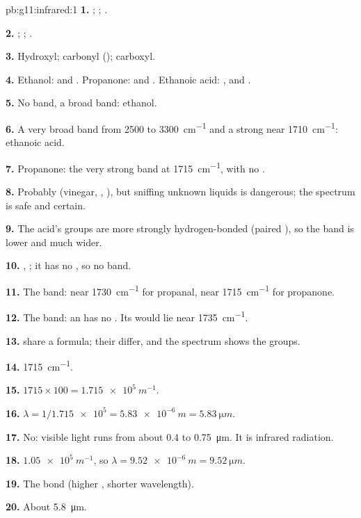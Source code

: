 \begin{solution}{pb:g11:infrared:1}
\textbf{1.} ; ; .

\textbf{2.} ; ; .

\textbf{3.} Hydroxyl; carbonyl (); carboxyl.

\textbf{4.} Ethanol:  and . Propanone:  and
. Ethanoic acid: ,  and .

\textbf{5.} No  band, a broad  band: ethanol.

\textbf{6.} A very broad  band from 2500 to \qty{3300}{cm^{-1}}
and a strong  near \qty{1710}{cm^{-1}}: ethanoic acid.

\textbf{7.} Propanone: the very strong  band at
\qty{1715}{cm^{-1}}, with no .

\textbf{8.} Probably (vinegar, , ), but sniffing unknown
liquids is dangerous; the spectrum is safe and certain.

\textbf{9.} The acid's  groups are more strongly hydrogen-bonded
(paired ), so the band is lower and much wider.

\textbf{10.} , ; it has no , so no
 band.

\textbf{11.} The  band: near \qty{1730}{cm^{-1}} for propanal,
near \qty{1715}{cm^{-1}} for propanone.

\textbf{12.} The  band: an  has no . Its 
would lie near \qty{1735}{cm^{-1}}.

\textbf{13.}  share a formula; their  differ,
and the spectrum shows the groups.

\textbf{14.} \qty{1715}{cm^{-1}}.

\textbf{15.} $1715 \times 100 = \qty{1.715e5}{m^{-1}}$.

\textbf{16.} $\lambda = 1/\num{1.715e5} = \qty{5.83e-6}{m} =
\qty{5.83}{\micro m}$.

\textbf{17.} No: visible light runs from about 0.4 to
\qty{0.75}{\micro m}. It is infrared radiation.

\textbf{18.} $\num{1.05e5}\ \si{m^{-1}}$, so $\lambda = \qty{9.52e-6}{m}
= \qty{9.52}{\micro m}$.

\textbf{19.} The  bond (higher , shorter wavelength).

\textbf{20.} About \qty{5.8}{\micro m}.
\end{solution}
